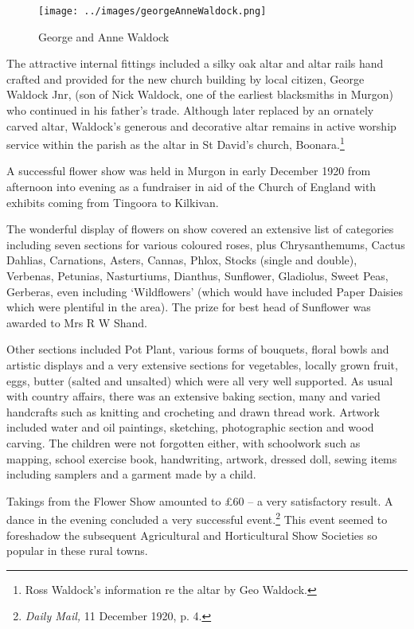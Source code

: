 \begin{figure}
\begin{center}
\texttt{[image: ../images/georgeAnneWaldock.png]}
\caption{George and Anne Waldock}
\end{center}
\end{figure}




The attractive internal fittings included a silky oak altar and altar rails hand crafted and provided for the new church building by local citizen, George Waldock Jnr, (son of Nick Waldock, one of the earliest blacksmiths in Murgon) who continued in his father's trade. Although later replaced by an ornately carved altar, Waldock's generous and decorative altar remains in active worship service within the parish as the altar in St David's church, Boonara.\footnote{Ross Waldock's information re the altar by Geo Waldock.}


A successful flower show was held in Murgon in early December 1920 from afternoon into evening as a fundraiser in aid of the Church of England with exhibits coming from Tingoora to Kilkivan.



The wonderful display of flowers on show covered an extensive list of categories including seven sections for various coloured roses, plus Chrysanthemums, Cactus Dahlias, Carnations, Asters, Cannas, Phlox, Stocks (single and double), Verbenas, Petunias, Nasturtiums, Dianthus, Sunflower, Gladiolus, Sweet Peas, Gerberas, even including `Wildflowers' (which would have included Paper Daisies which were plentiful in the area). The prize for best head of Sunflower was awarded to Mrs R W Shand.



Other sections included Pot Plant, various forms of bouquets, floral bowls and artistic displays and a very extensive sections for vegetables, locally grown fruit, eggs, butter (salted and unsalted) which were all very well supported. As usual with country affairs, there was an extensive baking section, many and varied handcrafts such as knitting and crocheting and drawn thread work. Artwork included water and oil paintings, sketching, photographic section and wood carving. The children were not forgotten either, with schoolwork such as mapping, school exercise book, handwriting, artwork, dressed doll, sewing items including samplers and a garment made by a child.



Takings from the Flower Show amounted to \pounds60 -- a very satisfactory result. A dance in the evening concluded a very successful event.\footnote{\emph{Daily Mail,} 11 December 1920, p. 4.} This event seemed to foreshadow the subsequent Agricultural and Horticultural Show Societies so popular in these rural towns.








